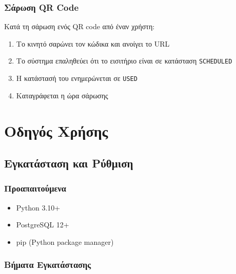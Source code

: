 \documentclass[12pt,a4paper]{report}
\begin{document}
\subsection{Σάρωση QR Code}

Κατά τη σάρωση ενός QR code από έναν χρήστη:
\begin{enumerate}
    \item Το κινητό σαρώνει τον κώδικα και ανοίγει το URL
    \item Το σύστημα επαληθεύει ότι το εισιτήριο είναι σε κατάσταση \texttt{SCHEDULED}
    \item Η κατάστασή του ενημερώνεται σε \texttt{USED}
    \item Καταγράφεται η ώρα σάρωσης
\end{enumerate}

\newpage

\chapter{Οδηγός Χρήσης}

\section{Εγκατάσταση και Ρύθμιση}

\subsection{Προαπαιτούμενα}
\begin{itemize}
    \item Python 3.10+
    \item PostgreSQL 12+
    \item pip (Python package manager)
\end{itemize}

\subsection{Βήματα Εγκατάστασης}
\end{document}
